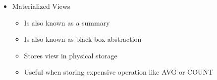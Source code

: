 \documentclass[12pt]{article}
\begin{document}
\begin{enumerate}[1.]
    \bigskip

    \begin{itemize}
        \item Materialized Views
        \begin{itemize}
            \item Is also known as a summary
            \item Is also known as black-box abstraction
            \item Stores view in physical storage
            \item Useful when storing expensive operation like AVG or COUNT
        \end{itemize}
    \end{itemize}
\end{enumerate}
\end{document}
